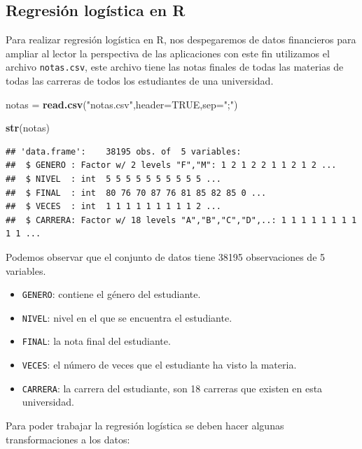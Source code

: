 \documentclass[letterpaper,]{book}
\newenvironment{Shaded}{\begin{snugshade}}{\end{snugshade}}
\newcommand{\DataTypeTok}[1]{\textcolor[rgb]{0.13,0.29,0.53}{#1}}
\newcommand{\KeywordTok}[1]{\textcolor[rgb]{0.13,0.29,0.53}{\textbf{#1}}}
\newcommand{\NormalTok}[1]{#1}
\newcommand{\OtherTok}[1]{\textcolor[rgb]{0.56,0.35,0.01}{#1}}
\newcommand{\StringTok}[1]{\textcolor[rgb]{0.31,0.60,0.02}{#1}}
\providecommand{\tightlist}{%
  \setlength{\itemsep}{0pt}\setlength{\parskip}{0pt}}
\begin{document}
\hypertarget{regresion-logistica-en-r}{%
\subsection{Regresión logística en R}\label{regresion-logistica-en-r}}

Para realizar regresión logística en R, nos despegaremos de datos financieros para ampliar al lector la perspectiva de las aplicaciones con este fin utilizamos el archivo \texttt{notas.csv}, este archivo tiene las notas finales de todas las materias de todas las carreras de todos los estudiantes de una universidad.

\begin{Shaded}
\begin{Highlighting}[]
\NormalTok{notas =}\StringTok{ }\KeywordTok{read.csv}\NormalTok{(}\StringTok{"notas.csv"}\NormalTok{,}\DataTypeTok{header=}\OtherTok{TRUE}\NormalTok{,}\DataTypeTok{sep=}\StringTok{";"}\NormalTok{)}

\KeywordTok{str}\NormalTok{(notas)}
\end{Highlighting}
\end{Shaded}

\begin{verbatim}
## 'data.frame':    38195 obs. of  5 variables:
##  $ GENERO : Factor w/ 2 levels "F","M": 1 2 1 2 2 1 1 2 1 2 ...
##  $ NIVEL  : int  5 5 5 5 5 5 5 5 5 5 ...
##  $ FINAL  : int  80 76 70 87 76 81 85 82 85 0 ...
##  $ VECES  : int  1 1 1 1 1 1 1 1 1 2 ...
##  $ CARRERA: Factor w/ 18 levels "A","B","C","D",..: 1 1 1 1 1 1 1 1 1 1 ...
\end{verbatim}

Podemos observar que el conjunto de datos tiene 38195 observaciones de 5 variables.

\begin{itemize}
\tightlist
\item
  \texttt{GENERO}: contiene el género del estudiante.
\item
  \texttt{NIVEL}: nivel en el que se encuentra el estudiante.
\item
  \texttt{FINAL}: la nota final del estudiante.
\item
  \texttt{VECES}: el número de veces que el estudiante ha visto la materia.
\item
  \texttt{CARRERA}: la carrera del estudiante, son 18 carreras que existen en esta universidad.
\end{itemize}

Para poder trabajar la regresión logística se deben hacer algunas transformaciones a los datos:
\end{document}
